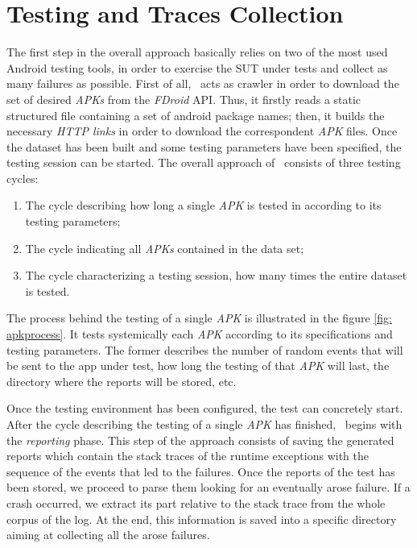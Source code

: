 \section{Testing and Traces Collection}
\label{approach:testing}
The first step in the overall approach basically relies on two of the most used Android testing tools, in order to exercise the SUT under tests and collect as many failures as possible. 
First of all, \toolname\ acts as crawler in order to download the set of desired \textit{APKs} from the \textit{FDroid} API. 
Thus, it firstly reads a static structured file containing a set of android package names; then, it builds the necessary \textit{HTTP links} in order to download the correspondent \textit{APK} files. 
Once the dataset has been built and some testing parameters have been specified, the testing session can be started. 
The overall approach of \toolname\ consists of three testing cycles: 
\begin{enumerate}
\item The cycle describing how long a single \textit{APK} is tested in according to its testing parameters;
\item The cycle indicating all \textit{APKs} contained in the data set;
\item The cycle characterizing a testing session, \ie how many times the entire dataset is tested. 
\end{enumerate}
The process behind the testing of a single \textit{APK} is illustrated in the figure \ref{fig: apkprocess}.
It tests systemically each \textit{APK} according to its specifications and testing parameters. The former describes the number of random events that will be sent to the app under test, how long the testing of that \textit{APK} will last, the directory where the reports will be stored, etc. 

Once the testing environment has been configured, the test can concretely start. 
After the cycle describing the testing of a single \textit{APK} has finished, \toolname\ begins with the \textit{reporting} phase. 
This step of the approach consists of saving the generated reports which contain the stack traces of the runtime exceptions with the sequence of the events that led to the failures. 
Once the reports of the test has been stored, we proceed to parse them looking for an eventually arose failure. If a crash occurred, we extract its part relative to the stack trace from the whole corpus of the log. At the end, this information is saved into a specific directory aiming at collecting all the arose failures.

